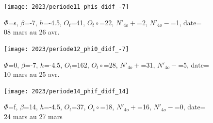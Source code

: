\documentclass[11pt,twocolumn,titlepage,twoside]{article}
\begin{document}
\begin{figure}[htbp]
        \centering
        \texttt{[image: 2023/periode11\_phis\_didf\_-7]}
        \caption{
                $\Phi$=s, 
                $\beta$=-7, 
                $h$=-4.5, 
                $O_t$=41, 
                $O_t\circ$=22,
                $N'_{4o}+$=2, 
                $N'_{4o}-$=1,
                date= 08 mars au 26 avr.               
               }
                \label{periode11}
\end{figure}


\begin{figure}[htbp]
        \centering
        \texttt{[image: 2023/periode12\_phi0\_didf\_-7]}
        \caption{
                $\Phi$=0, 
                $\beta$=-7, 
                $h$=-4.5, 
                $O_t$=162, 
                $O_t\circ$=28,
                $N'_{4o}+$=31, 
                $N'_{4o}-$=5,
                date= 10 mars au 25 avr.               
               }
                \label{periode11}
\end{figure}


\begin{figure}[htbp]
        \centering
        \texttt{[image: 2023/periode14\_phif\_didf\_14]}
        \caption{
                $\Phi$=f, 
                $\beta$=14, 
                $h$=-4.5, 
                $O_t$=37, 
                $O_t\circ$=18,
                $N'_{4o}+$=16, 
                $N'_{4o}-$=0,
                date= 24 mars au 27 mars               
               }
                \label{periode11}
\end{figure}
\clearpage
\FloatBarrier

\end{document}
